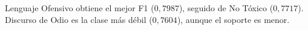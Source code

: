 Lenguaje Ofensivo obtiene el mejor F1 ($0{,}7987$), seguido de No Tóxico ($0{,}7717$). Discurso de Odio es la clase más débil ($0{,}7604$), aunque el soporte es menor.
